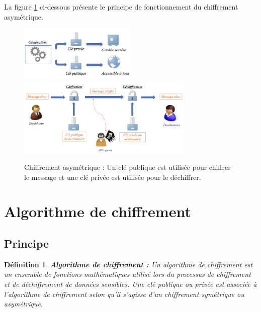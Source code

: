 \documentclass[oneside]{book}
\newtheorem{definition}{Définition}[section]
\begin{document}
\hspace{-0.5cm}La figure \ref{fig:asymétrique} ci-dessous présente le principe de fonctionnement du chiffrement asymétrique.

\begin{figure}[htbp]
    \centering
    \includegraphics[width=0.5\textwidth]{image/cle_asymetrique}
    \includegraphics[width=0.75\textwidth]{image/asymetrique}
    \caption{Chiffrement asymétrique : Un clé publique est utilisée pour chiffrer le message et une clé privée est utilisée pour le déchiffrer.}
    \label{fig:asymétrique}
\end{figure}

\newpage
\section{Algorithme de chiffrement}
\label{sec:algo}

\subsection{Principe}
\label{sec:Introduction}

\theoremstyle{definition}
\begin{definition}{\textbf{Algorithme de chiffrement \cite{intro_crypto}:}}
Un algorithme de chiffrement est un ensemble de fonctions mathématiques utilisé lors du processus de chiffrement et de déchiffrement de données sensibles. Une clé publique ou privée est associée à l'algorithme de chiffrement selon qu'il s'agisse d'un chiffrement symétrique ou asymétrique.
\end{definition}
\end{document}

